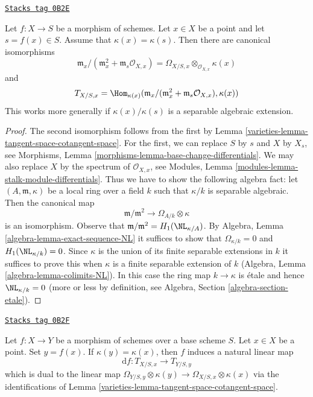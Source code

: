 \begin{lemma}
\label{varieties-lemma-tangent-space-rational-point}
\href{https://stacks.math.columbia.edu/tag/0B2E}{\texttt{Stacks tag 0B2E}}

Let $f : X \to S$ be a morphism of schemes.
Let $x \in X$ be a point and let $s = f(x) \in S$.
Assume that $\kappa(x) = \kappa(s)$. Then there are canonical isomorphisms
$$
\mathfrak m_x/(\mathfrak m_x^2 + \mathfrak m_s\mathcal{O}_{X, x})
=
\Omega_{X/S, x} \otimes_{\mathcal{O}_{X, x}} \kappa(x)
$$
and
$$
T_{X/S, x} =
\Hom_{\kappa(x)}(
\mathfrak m_x/(\mathfrak m_x^2 + \mathfrak m_s\mathcal{O}_{X, x}),
\kappa(x))
$$
This works more generally if $\kappa(x)/\kappa(s)$ is a separable
algebraic extension.
\end{lemma}

\begin{proof}

The second isomorphism follows from the first by
Lemma \ref{varieties-lemma-tangent-space-cotangent-space}.
For the first, we can replace $S$ by $s$ and $X$ by $X_s$, see
Morphisms, Lemma \ref{morphisms-lemma-base-change-differentials}.
We may also replace $X$ by the spectrum of $\mathcal{O}_{X, x}$, see
Modules, Lemma \ref{modules-lemma-stalk-module-differentials}.
Thus we have to show the following algebra fact: let
$(A, \mathfrak m, \kappa)$ be a local ring over a field $k$
such that $\kappa/k$ is separable algebraic. Then the canonical map
$$
\mathfrak m/\mathfrak m^2
\longrightarrow
\Omega_{A/k} \otimes \kappa
$$
is an isomorphism. Observe that
$\mathfrak m/\mathfrak m^2 = H_1(\NL_{\kappa/A})$. By
Algebra, Lemma \ref{algebra-lemma-exact-sequence-NL}
it suffices to show that $\Omega_{\kappa/k} = 0$ and
$H_1(\NL_{\kappa/k}) = 0$. Since $\kappa$ is the union of
its finite separable extensions in $k$ it suffices to prove
this when $\kappa$ is a finite separable extension of $k$
(Algebra, Lemma \ref{algebra-lemma-colimits-NL}).
In this case the ring map $k \to \kappa$ is \'etale
and hence $\NL_{\kappa/k} = 0$ (more or less by definition, see
Algebra, Section \ref{algebra-section-etale}).
\end{proof}

\begin{lemma}
\label{varieties-lemma-map-tangent-spaces}
\href{https://stacks.math.columbia.edu/tag/0B2F}{\texttt{Stacks tag 0B2F}}

Let $f : X \to Y$ be a morphism of schemes over a base scheme $S$.
Let $x \in X$ be a point. Set $y = f(x)$. If $\kappa(y) = \kappa(x)$,
then $f$ induces a natural linear map
$$
\text{d}f : T_{X/S, x} \longrightarrow T_{Y/S, y}
$$
which is dual to the linear map
$\Omega_{Y/S, y} \otimes \kappa(y) \to \Omega_{X/S, x} \otimes \kappa(x)$
via the identifications of Lemma \ref{varieties-lemma-tangent-space-cotangent-space}.
\end{lemma}

